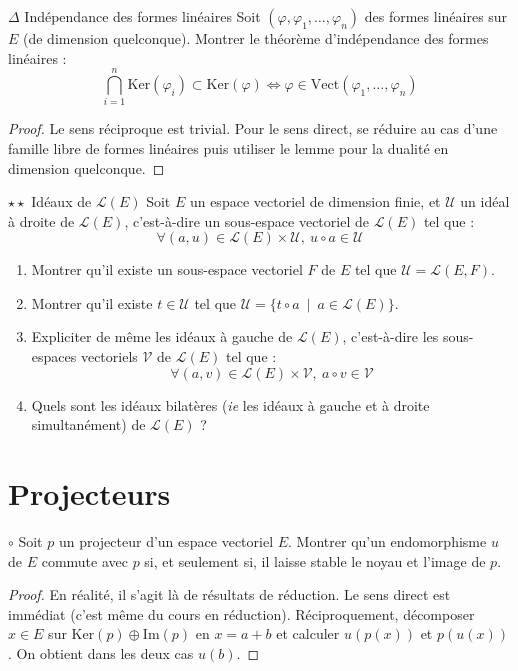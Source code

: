 \documentclass[french,a4paper]{article}
\renewcommand{\ker}{\text{Ker}}
\newcommand{\im}{\text{Im}}
\theoremstyle{plain}
\theoremstyle{definition}
\theoremstyle{remark}
\begin{document}
\begin{ex}[Moulin.51]{$\Delta$ Indépendance des formes linéaires} Soit $(\varphi,\varphi_1,\ldots,\varphi_n)$ des formes linéaires sur $E$ (de dimension quelconque). Montrer le théorème d'indépendance des formes linéaires : $$\bigcap_{i=1}^n\ker(\varphi_i)\subset \ker(\varphi)\iff\varphi\in\text{Vect}(\varphi_1,\ldots,\varphi_n)$$
\end{ex}
\begin{proof}
	Le sens réciproque est trivial. Pour le sens direct, se réduire au cas d'une famille libre de formes linéaires puis utiliser le lemme pour la dualité en dimension quelconque.
\end{proof}

\begin{ex}[Moulin.52]{$\star\star$ Idéaux de $\mathcal{L}(E)$}
	Soit $E$ un espace vectoriel de dimension finie, et $\mathcal{U}$ un idéal à droite de $\mathcal{L}(E)$, c'est-à-dire un sous-espace vectoriel de $\mathcal{L}(E)$ tel que : $$\forall (a,u)\in\mathcal{L}(E)\times \mathcal{U},\ u\circ a\in\mathcal{U}$$
	\begin{enumerate}
		\item Montrer qu'il existe un sous-espace vectoriel $F$ de $E$ tel que $\mathcal{U}=\mathcal{L}(E,F)$.
		\item Montrer qu'il existe $t\in\mathcal{U}$ tel que $\mathcal{U}=\{t\circ a\ \mid\ a\in\mathcal{L}(E)\}$.
		\item Expliciter de même les idéaux à gauche de $\mathcal{L}(E)$, c'est-à-dire les sous-espaces vectoriels $\mathcal{V}$ de $\mathcal{L}(E)$ tel que : $$\forall (a,v)\in\mathcal{L}(E)\times \mathcal{V},\ a\circ v\in\mathcal{V}$$
		\item Quels sont les idéaux bilatères (\textit{ie} les idéaux à gauche et à droite simultanément) de $\mathcal{L}(E)$ ?
	\end{enumerate}
\end{ex}

\section{Projecteurs}

\begin{ex}[Moulin.53]{$\circ$}
	Soit $p$ un projecteur d'un espace vectoriel $E$. Montrer qu'un endomorphisme $u$ de $E$ commute avec $p$ si, et seulement si, il laisse stable le noyau et l'image de $p$.
\end{ex}
\begin{proof}
	En réalité, il s'agit là de résultats de réduction. Le sens direct est immédiat (c'est même du cours en réduction). Réciproquement, décomposer $x\in E$ sur $\ker(p)\oplus\im(p)$ en $x=a+b$ et calculer $u(p(x))$ et $p(u(x))$. On obtient dans les deux cas $u(b)$.
\end{proof}
\end{document}
